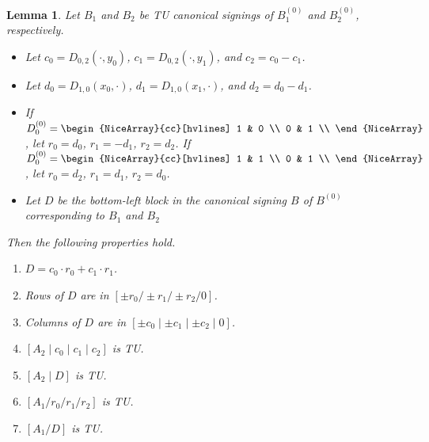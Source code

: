 \documentclass{article}
\newtheorem{lemma}{Lemma}
\theoremstyle{definition}
\begin{document}
\begin{lemma}\label{lem:canonical_signing_properties}
    Let $B_{1}$ and $B_{2}$ be TU canonical signings of $B_{1}^{(0)}$ and $B_{2}^{(0)}$, respectively.
    \begin{itemize}
        \item Let $c_{0} = D_{0, 2} (\cdot, y_{0})$, $c_{1} = D_{0, 2} (\cdot, y_{1})$, and $c_{2} = c_{0} - c_{1}$.
        \item Let $d_{0} = D_{1, 0} (x_{0}, \cdot)$, $d_{1} = D_{1, 0} (x_{1}, \cdot)$, and $d_{2} = d_{0} - d_{1}$.
        \item If $D_{0}^{(0)} = \begin{NiceArray}{cc}[hvlines] 1 & 0 \\ 0 & 1 \\ \end{NiceArray}$, let $r_{0} = d_{0}$, $r_{1} = -d_{1}$, $r_{2} = d_{2}$. If $D_{0}^{(0)} = \begin{NiceArray}{cc}[hvlines] 1 & 1 \\ 0 & 1 \\ \end{NiceArray}$, let $r_{0} = d_{2}$, $r_{1} = d_{1}$, $r_{2} = d_{0}$.
        \item Let $D$ be the bottom-left block in the canonical signing $B$ of $B^{(0)}$ corresponding to $B_{1}$ and $B_{2}$
    \end{itemize}
    Then the following properties hold.
    \begin{enumerate}
        \item $D = c_{0} \cdot r_{0} + c_{1} \cdot r_{1}$.
        \item Rows of $D$ are in $[\pm r_{0} / \pm r_{1} / \pm r_{2} / 0]$.
        \item Columns of $D$ are in $[\pm c_{0} \mid \pm c_{1} \mid \pm c_{2} \mid 0]$.
        \item $[A_{2} \mid c_{0} \mid c_{1} \mid c_{2}]$ is TU.
        \item $[A_{2} \mid D]$ is TU.
        \item $[A_{1} / r_{0} / r_{1} / r_{2}]$ is TU.
        \item $[A_{1} / D]$ is TU.
    \end{enumerate}
\end{lemma}
\end{document}
